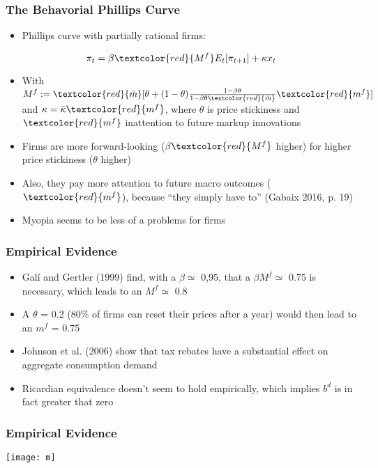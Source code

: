 \documentclass{beamer}
\begin{document}

\begin{frame}
\frametitle{The Behavorial Phillips Curve}
\begin{itemize}
\item Phillips curve with partially rational firms:
\end{itemize}
	$$\pi_{t}=\beta \textcolor{red}{M^{f}}E_{t}[\pi_{t+1}]+\kappa x_{t}$$
\begin{itemize}
\item With $M^{f}:=\textcolor{red}{\bar m}[\theta+(1-\theta)\frac{1-\beta \theta}{1-\beta \theta \textcolor{red}{\bar m}}\textcolor{red}{m^{f}}]$ and $\kappa=\bar \kappa \textcolor{red}{m^{f}}$, where $\theta$ is price stickiness and $\textcolor{red}{m^{f}}$ inattention to future markup innovations
\item Firms are more forward-looking ($\beta \textcolor{red}{ M^{f}}$ higher) for higher price stickiness ($\theta$ higher) 
\item Also, they pay more attention to future macro outcomes ($\textcolor{red}{m^{f}}$),  because ``they simply have to'' (Gabaix 2016, p. 19)
\item Myopia seems to be less of a problems for firms
\end{itemize}
\end{frame}


\begin{frame}
\frametitle{Empirical Evidence}
\begin{itemize}
\item Gal\'{i} and Gertler (1999) find, with a $\beta \simeq$ 0,95, that a $\beta M^{f}\simeq$ 0.75 is necessary, which leads to an $M^{f}\simeq$ 0.8
\item A $\theta$ = 0.2 (80\% of firms can reset their prices after a year) would then lead to an ${m^{f}}$ = 0.75
\item Johnson et al. (2006) show that tax rebates have a substantial effect on aggregate consumption demand
\item Ricardian equivalence doesn't seem to hold empirically, which implies $b^{d}$ is in fact greater that zero  
\end{itemize}
\end{frame}


\begin{frame}

\frametitle{Empirical Evidence}
\texttt{[image: m]}


\end{frame}

\end{document}
